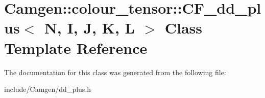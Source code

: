 \hypertarget{a00037}{\section{Camgen\-:\-:colour\-\_\-tensor\-:\-:C\-F\-\_\-dd\-\_\-plus$<$ N, I, J, K, L $>$ Class Template Reference}
\label{a00037}
}


The documentation for this class was generated from the following file\-:\begin{DoxyCompactItemize}
\item 
include/\-Camgen/dd\-\_\-plus.\-h\end{DoxyCompactItemize}
